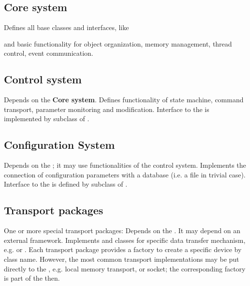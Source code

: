 \subsection{Core system}
  Defines all base classes and interfaces, like 
   \bbul
   \item {}
   \item {}
   \item {}
   \item {}
   \item {}
   \item {}
   \item {}
   \item {}
   \ebul 
   and basic functionality for object organization, memory management, 
   thread control, event communication.
\subsection{Control system}
   Depends on the {\bf Core system}. Defines 
   functionality of state machine, command transport, parameter 
   monitoring and modification. Interface to the  is 
   implemented by subclass of .       
\subsection{Configuration System}
   Depends on the ; it 
   may use functionalities of the control system. Implements the 
   connection of configuration parameters with a database 
   (i.e. a file in trivial case). Interface to the  is defined 
   by subclass of . 
\subsection{Transport packages}
   One or more special transport packages: Depends on the . 
   It may depend on an external framework. Implements  and 
    classes for specific data transfer mechanism, e.g. 
    or . Each transport package provides a 
   factory to create a specific device by class name. 
   However, the most common transport implementations may be put 
   directly to the , e.g. local memory transport, or 
   socket; the corresponding factory is part of the  then. 
